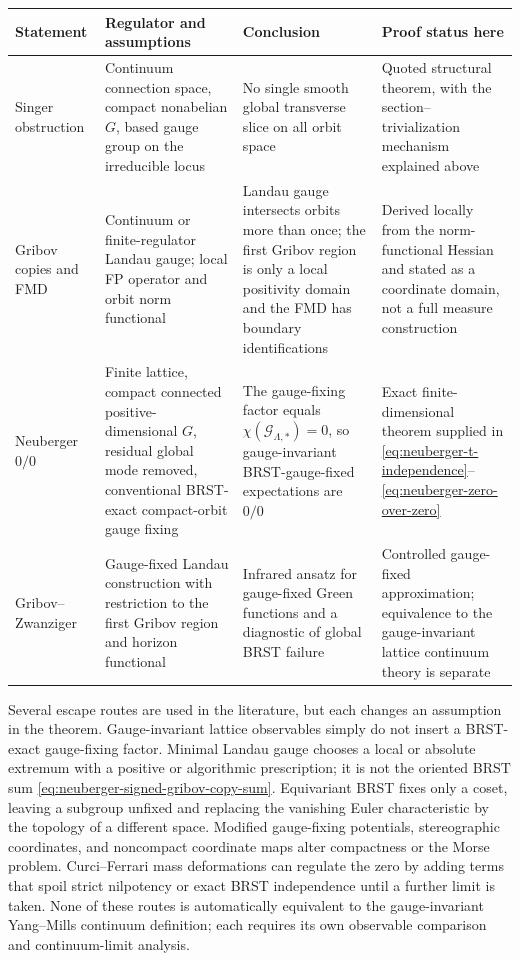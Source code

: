 \begin{center}
\scriptsize
\begin{tabular}{>{\raggedright\arraybackslash}p{}
                >{\raggedright\arraybackslash}p{}
                >{\raggedright\arraybackslash}p{}
                >{\raggedright\arraybackslash}p{}}
\hline
Statement & Regulator and assumptions & Conclusion & Proof status here \\
\hline
Singer obstruction &
Continuum connection space, compact nonabelian \(G\), based gauge group on the
irreducible locus &
No single smooth global transverse slice on all orbit space &
Quoted structural theorem, with the section--trivialization mechanism explained
above \\
Gribov copies and FMD &
Continuum or finite-regulator Landau gauge; local FP operator and orbit norm
functional &
Landau gauge intersects orbits more than once; the first Gribov region is only
a local positivity domain and the FMD has boundary identifications &
Derived locally from the norm-functional Hessian and stated as a coordinate
domain, not a full measure construction \\
Neuberger \(0/0\) &
Finite lattice, compact connected positive-dimensional \(G\), residual global
mode removed, conventional BRST-exact compact-orbit gauge fixing &
The gauge-fixing factor equals
\(\chi(\mathcal G_{\Lambda,\ast})=0\), so gauge-invariant BRST-gauge-fixed
expectations are \(0/0\) &
Exact finite-dimensional theorem supplied in
\eqref{eq:neuberger-t-independence}--\eqref{eq:neuberger-zero-over-zero} \\
Gribov--Zwanziger &
Gauge-fixed Landau construction with restriction to the first Gribov region and
horizon functional &
Infrared ansatz for gauge-fixed Green functions and a diagnostic of global BRST
failure &
Controlled gauge-fixed approximation; equivalence to the gauge-invariant
lattice continuum theory is separate \\
\hline
\end{tabular}
\end{center}

Several escape routes are used in the literature, but each changes an
assumption in the theorem.  Gauge-invariant lattice observables simply do not
insert a BRST-exact gauge-fixing factor.  Minimal Landau gauge chooses a local
or absolute extremum with a positive or algorithmic prescription; it is not the
oriented BRST sum \eqref{eq:neuberger-signed-gribov-copy-sum}.  Equivariant
BRST fixes only a coset, leaving a subgroup unfixed and replacing the vanishing
Euler characteristic by the topology of a different space.  Modified
gauge-fixing potentials, stereographic coordinates, and noncompact coordinate
maps alter compactness or the Morse problem.  Curci--Ferrari mass deformations
can regulate the zero by adding terms that spoil strict nilpotency or exact
BRST independence until a further limit is taken.  None of these routes is
automatically equivalent to the gauge-invariant Yang--Mills continuum
definition; each requires its own observable comparison and continuum-limit
analysis.

